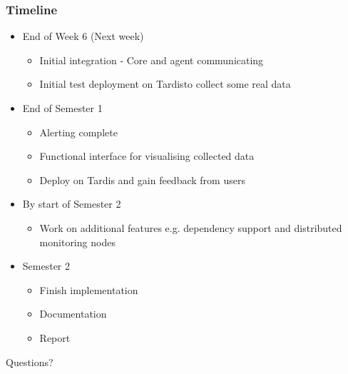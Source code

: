 \documentclass{beamer}
\begin{document}
	\begin{frame}
		\frametitle{Timeline}
		\begin{itemize}
			\item End of Week 6 (Next week)
			\begin{itemize}
				\item Initial integration - Core and agent communicating
				\item Initial test deployment on Tardis\footnotemark to collect some real data
			\end{itemize}
			\pause
			\item End of Semester 1
			\begin{itemize}
				\item Alerting complete
				\item Functional interface for visualising collected data
				\item Deploy on Tardis and gain feedback from users
			\end{itemize}
			\pause
			\item By start of Semester 2
			\begin{itemize}
				\item Work on additional features e.g. dependency support and distributed monitoring
				nodes
			\end{itemize}
			\pause 
			\item Semester 2
			\begin{itemize}
				\item Finish implementation
				\item Documentation
				\item Report
			\end{itemize}
		\end{itemize}
		
	\end{frame}
	
	\begin{frame}
		Questions?
	\end{frame}
\end{document}
